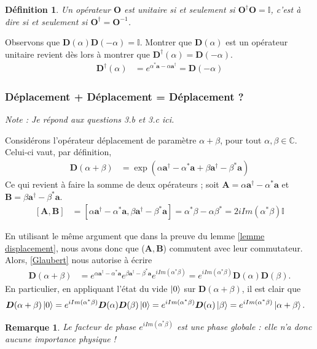\documentclass[11pt,oneside,a4paper]{article}
\newtheorem{definition}[theorem]{Définition}
\newtheorem{remark}[theorem]{Remarque}
\begin{document}
\begin{definition}
  Un opérateur $\bm{O}$ est unitaire si et seulement si $\bm{O}^\dagger\bm{O} = \mathbb{I}$, c'est à dire si et seulement si $\bm{O}^\dagger = \bm{O}^{-1}$.
\end{definition}

Observons que $\bm{D}(\alpha)\bm{D}(-\alpha) = \mathbb{I}$. Montrer que $\bm{D}(\alpha)$ est un opérateur unitaire revient dès lors à montrer que $\bm{D}^\dagger(\alpha) = \bm{D}(-\alpha)$.
\begin{align}
  \bm{D}^\dagger(\alpha) &= e^{\alpha^*\bm{a}-\alpha\bm{a}^\dagger} = \bm{D}(-\alpha) 
\end{align}

\subsubsection{Déplacement + Déplacement = Déplacement ?}
\emph{Note : Je répond aux questions 3.b et 3.c ici.}

Considérons l'opérateur déplacement de paramètre $\alpha+\beta$, pour tout $\alpha,\beta\in\mathbb{C}$. Celui-ci vaut, par définition,
\begin{align}
  \bm{D}(\alpha+\beta) &= \exp(\alpha\bm{a}^\dagger-\alpha^*\bm{a}+\beta\bm{a}^\dagger-\beta^*\bm{a})
\end{align}
Ce qui revient à faire la somme de deux opérateurs ; soit $\bm{A} = \alpha\bm{a}^\dagger-\alpha^*\bm{a}$ et $\bm{B} = \beta\bm{a}^\dagger-\beta^*\bm{a}$.
\begin{align}
  \left[\bm{A},\bm{B}\right] &= \left[\alpha\bm{a}^\dagger-\alpha^*\bm{a},\beta\bm{a}^\dagger-\beta^*\bm{a}\right] = \alpha^*\beta-\alpha\beta^* = 2i Im(\alpha^*\beta)\mathbb{I}
\end{align}

En utilisant le même argument que dans la preuve du lemme \ref{lemme displacement}, nous avons donc que ($\bm{A},\bm{B}$) commutent avec leur commutateur. Alors, \eqref{Glaubert} nous autorise à écrire
\begin{align}
  \bm{D}(\alpha+\beta) &= e^{\alpha\bm{a}^\dagger-\alpha^*\bm{a}}e^{\beta\bm{a}^\dagger-\beta^*\bm{a}}e^{iIm(\alpha^*\beta)} = e^{iIm(\alpha^*\beta)}\bm{D}(\alpha)\bm{D}(\beta).
\end{align}
En particulier, en appliquant l'état du vide $\ket{0}$ sur $\bm{D}(\alpha+\beta)$, il est clair que
\begin{align}
  \bm{D}(\alpha+\beta)\ket{0} &= e^{iIm(\alpha^*\beta)}\bm{D}(\alpha)\bm{D}(\beta)\ket{0} = e^{iIm(\alpha^*\beta)}\bm{D}(\alpha)\ket{\beta} = e^{iIm(\alpha^*\beta)}\ket{\alpha+\beta}.
\end{align}
\begin{remark}
  Le facteur de phase $e^{iIm(\alpha^*\beta)}$ est une phase globale : elle n'a donc aucune importance physique ! 
\end{remark}
\end{document}
